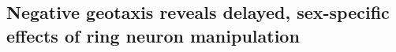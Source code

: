 
\subsection*{Negative geotaxis reveals delayed, sex-specific effects of ring neuron manipulation}

